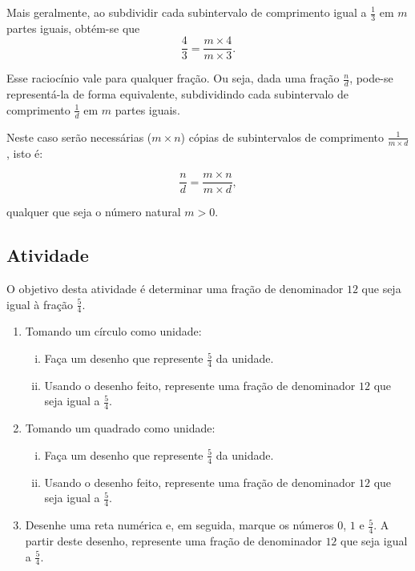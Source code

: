 \begin{refletindo*}
Mais geralmente, ao subdividir cada subintervalo de comprimento igual a $\frac{1}{3}$ em $m$ partes iguais, obtém-se que
$$\dfrac{4}{3} = \dfrac{m \times 4}{m \times 3}.$$

Esse raciocínio vale para qualquer fração. Ou seja, dada uma fração $\frac{n}{d}$, pode-se representá-la de forma equivalente, subdividindo cada subintervalo de comprimento $\frac{1}{d}$ em $m$ partes iguais. 

Neste caso serão necessárias ($m \times n$) cópias de subintervalos de comprimento $\frac{1}{m \times d}$, isto é:

$$\dfrac{n}{d} = \dfrac{m \times n}{m \times d},$$

qualquer que seja o número natural $m > 0$.

\end{refletindo*}

\subsection{Atividade}

O objetivo desta atividade é determinar uma fração de denominador $12$ que seja igual à fração $\frac{5}{4}$.

\begin{enumerate} [\quad a)] %
  \item     Tomando um círculo como unidade: 
\begin{enumerate}[(i)]
  \item Faça um desenho que represente     $\frac{5}{4}$ da unidade.
  \item Usando o desenho feito, represente uma fração de denominador     $12$ que seja igual a     $\frac{5}{4}$.
\end{enumerate}  
  \item     Tomando um quadrado como unidade:
  \begin{enumerate}[(i)]
  \item Faça um desenho que represente     $\frac{5}{4}$ da unidade.
  \item Usando o desenho feito, represente uma fração de denominador     $12$ que seja igual a     $\frac{5}{4}$.
  \end{enumerate}
\item     Desenhe uma reta numérica e, em seguida, marque os números     $0$,     $1$ e     $\frac{5}{4}$. A partir deste desenho, represente uma fração de denominador     $12$ que seja igual a     $\frac{5}{4}$. 
\end{enumerate} %

